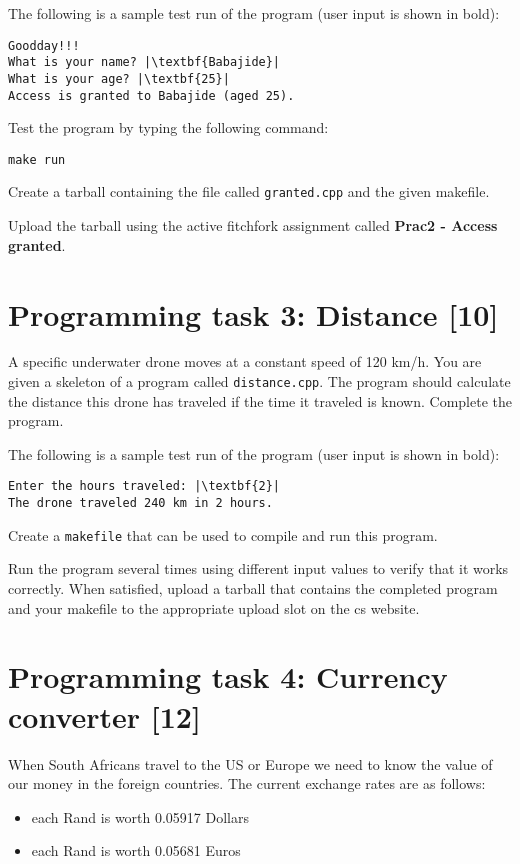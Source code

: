 \documentclass [a4paper,leqno, 12pt] {article}
\begin{document}
The following is a sample test run of the program (user input is shown in bold): 

\begin{lstlisting}
Goodday!!!
What is your name? |\textbf{Babajide}|
What is your age? |\textbf{25}|
Access is granted to Babajide (aged 25).
\end{lstlisting}

Test the program by typing the following command:
\begin{center}
 \texttt{make run} 
\end{center}

Create a tarball containing the file called \texttt{granted.cpp} and the given makefile. 

Upload the tarball using the active fitchfork assignment called \textbf{Prac2 - Access granted}.

\section{Programming task 3: Distance [10]}

 A specific underwater drone moves at a constant speed of 120 km/h. You are given a skeleton of a program called \texttt{distance.cpp}. The program should calculate the distance this drone has traveled if the time it traveled is known. Complete the program.

The following is a sample test run of the program (user input is shown in bold): 
\begin{lstlisting}
Enter the hours traveled: |\textbf{2}|
The drone traveled 240 km in 2 hours.
\end{lstlisting}

Create a \texttt{makefile} that can be used to compile and run this program.

Run the program several times using different input values to verify that it works correctly. When satisfied, upload a tarball that contains the completed program and your makefile to the appropriate upload slot on the cs website.

\section{Programming task 4: Currency converter [12]}

When South Africans travel to the US or Europe we need to know the value of our money in the foreign countries. The current exchange rates are as follows:
\begin{itemize}
\item each Rand is worth 0.05917 Dollars 
\item each Rand is worth 0.05681 Euros 
\end{itemize}
  
\end{document}
